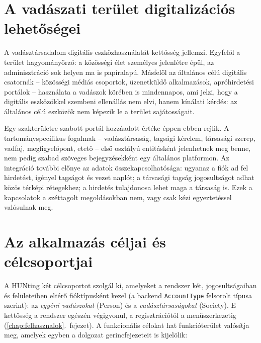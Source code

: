 \section{A vadászati terület digitalizációs lehetőségei}
\label{sec:bev-digitalizacio}

A vadásztársadalom digitális eszközhasználatát kettősség jellemzi. Egyfelől a terület
hagyományőrző: a közösségi élet személyes jelenlétre épül, az adminisztráció sok helyen ma is
papíralapú. Másfelől az általános célú digitális csatornák -- közösségi médiás csoportok,
üzenetküldő alkalmazások, apróhirdetési portálok -- használata a vadászok körében is
mindennapos, ami jelzi, hogy a digitális eszközökkel szembeni ellenállás nem elvi, hanem
kínálati kérdés: az általános célú eszközök nem képezik le a terület sajátosságait.

Egy szakterületre szabott portál hozzáadott értéke éppen ebben rejlik. A tartományspecifikus
fogalmak -- vadásztársaság, tagsági kérelem, társasági szerep, vadfaj, megfigyelőpont, etető --
első osztályú entitásként jelenhetnek meg benne, nem pedig szabad szöveges bejegyzésekként egy
általános platformon. Az integráció további előnye az adatok összekapcsolhatósága: ugyanaz a
fiók ad fel hirdetést, igényel tagságot és vezet naplót; a társasági tagság jogosultságot
adhat közös térképi rétegekhez; a hirdetés tulajdonosa lehet maga a társaság is. Ezek a
kapcsolatok a széttagolt megoldásokban nem, vagy csak kézi egyeztetéssel valósulnak meg.

\section{Az alkalmazás céljai és célcsoportjai}
\label{sec:bev-celok}

A HUNting két célcsoportot szolgál ki, amelyeket a rendszer két, jogosultságaiban és
felületeiben eltérő fióktípusként kezel (a backend \texttt{AccountType} felsorolt típusa
szerint): az \emph{egyéni vadászokat} (Person) és a \emph{vadásztársaságokat} (Society).
E kettősség a rendszer egészén végigvonul, a regisztrációtól a menüszerkezetig
(\ref{chap:felhasznalok}.~fejezet). A funkcionális célokat hat funkcióterület valósítja meg,
amelyek egyben a dolgozat gerincfejezeteit is kijelölik:

